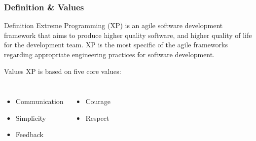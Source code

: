 \begin{frame}
    \frametitle{Definition \& Values}
    \begin{block}{Definition}
        Extreme Programming (XP) is an agile software development framework that aims to produce higher quality software, and higher quality of life for the development team. XP is the most specific of the agile frameworks regarding appropriate engineering practices for software development.
    \end{block}\pause
    \begin{exampleblock}{Values}
        XP is based on five core values:
        \begin{columns}
            \begin{itemize}
                \item Communication\pause
                \item Simplicity\pause
                \item Feedback\pause
            \end{itemize}
            \begin{itemize}
                \item Courage\pause
                \item Respect\pause
            \end{itemize}
        \end{columns}
    \end{exampleblock}
\end{frame}
